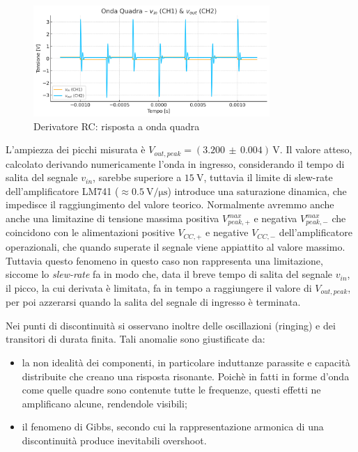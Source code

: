 \documentclass[a4paper,12pt]{article}
\begin{document}
\begin{figure}[H]
  \centering
  \includegraphics[width=0.8\textwidth]{Quadra.png}
  \caption{Derivatore RC: risposta a onda quadra}
  \label{fig:derivatore_quadra}
\end{figure}

L’ampiezza dei picchi misurata è \(V_{out,peak} = (3.200\,\pm\,0.004)\,\mathrm{V}\). Il valore atteso, calcolato derivando numericamente l’onda in ingresso, considerando il tempo di salita del segnale \(v_{in}\), sarebbe superiore a \(\SI{15}{\volt}\), tuttavia il limite di slew-rate dell’amplificatore LM741 (\(\approx \SI{0.5}{\volt/\micro\second}\)) introduce una saturazione dinamica, che impedisce il raggiungimento del valore teorico.
Normalmente avremmo anche anche una limitazine di tensione massima positiva \(V_{peak, +}^{max}\) e negativa \(V_{peak, -}^{max}\) che coincidono con le alimentazioni positive \(V_{CC, +}\) e negative \(V_{CC, -}\) dell'amplificatore operazionali, che quando superate il segnale viene appiattito al valore massimo. Tuttavia questo fenomeno in questo caso non rappresenta una limitazione, siccome lo \textit{slew-rate} fa in modo che, data il breve tempo di salita del segnale \(v_{in}\), il picco, la cui derivata è limitata, fa in tempo a raggiungere il valore di \(V_{out, peak}\), per poi azzerarsi quando la salita del segnale di ingresso è terminata. 

Nei punti di discontinuità si osservano inoltre delle oscillazioni (ringing) e dei transitori di durata finita. Tali anomalie sono giustificate da:

\begin{itemize}
  \item la non idealità dei componenti, in particolare induttanze parassite e capacità distribuite che creano una risposta risonante. Poichè in fatti in forme d'onda come quelle quadre sono contenute tutte le frequenze, questi effetti ne amplificano alcune, rendendole visibili;
  \item il fenomeno di Gibbs, secondo cui la rappresentazione armonica di una discontinuità produce inevitabili overshoot.
\end{itemize}
\end{document}
